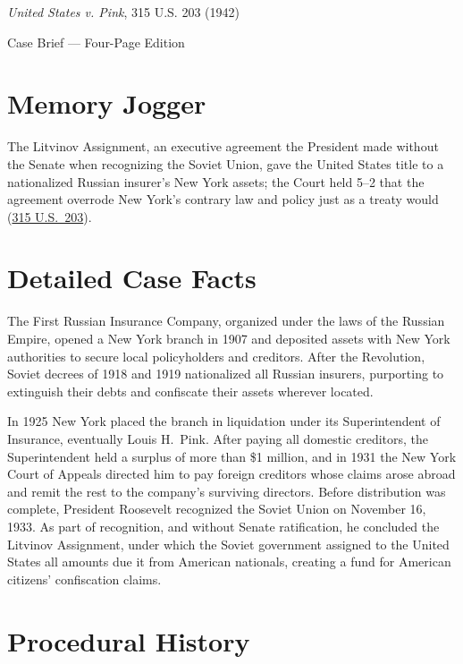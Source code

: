 \documentclass[12pt]{article}
\begin{document}
\begin{center}
{\LARGE \textit{United States v. Pink}, 315 U.S. 203 (1942)\par}
\vspace{0.8em}
{\large Case Brief --- Four-Page Edition\par}
\end{center}
\vspace{1em}

\section{Memory Jogger}

The Litvinov Assignment, an executive agreement the President made without the Senate when recognizing the Soviet Union, gave the United States title to a nationalized Russian insurer's New York assets; the Court held 5--2 that the agreement overrode New York's contrary law and policy just as a treaty would (\href{https://supreme.justia.com/cases/federal/us/315/203/}{315 U.S.\ 203}).

\section{Detailed Case Facts}

The First Russian Insurance Company, organized under the laws of the Russian Empire, opened a New York branch in 1907 and deposited assets with New York authorities to secure local policyholders and creditors. After the Revolution, Soviet decrees of 1918 and 1919 nationalized all Russian insurers, purporting to extinguish their debts and confiscate their assets wherever located.

In 1925 New York placed the branch in liquidation under its Superintendent of Insurance, eventually Louis H.\ Pink. After paying all domestic creditors, the Superintendent held a surplus of more than \$1 million, and in 1931 the New York Court of Appeals directed him to pay foreign creditors whose claims arose abroad and remit the rest to the company's surviving directors. Before distribution was complete, President Roosevelt recognized the Soviet Union on November 16, 1933. As part of recognition, and without Senate ratification, he concluded the Litvinov Assignment, under which the Soviet government assigned to the United States all amounts due it from American nationals, creating a fund for American citizens' confiscation claims.

\section{Procedural History}
\end{document}
